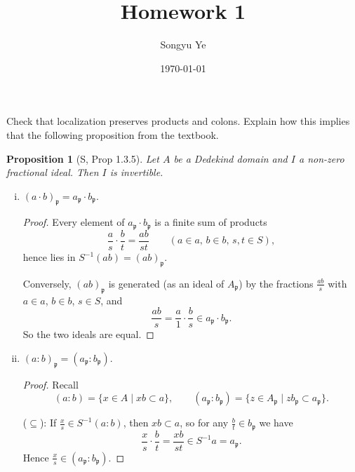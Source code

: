 \documentclass[12pt]{article}  %
\title{Homework 1}
\author{Songyu Ye}
\date{\today}
\newtheorem{proposition}{Proposition}[section]
\begin{document}
\psettitle

\begin{problem}{1}
Check that localization preserves products and colons. Explain how this implies that the following proposition from the textbook. 
\begin{proposition}[S, Prop 1.3.5]
    Let $A$ be a Dedekind domain and $I$ a non-zero fractional ideal. Then $I$ is invertible.       
\end{proposition}
\end{problem}

\begin{solution}

\begin{enumerate}[(i)]
  \item $(a \cdot b)_{\mathfrak{p}} = a_{\mathfrak{p}} \cdot b_{\mathfrak{p}}$.

  \begin{proof}
  Every element of $a_{\mathfrak{p}} \cdot b_{\mathfrak{p}}$ is a finite sum of products
  \[
    \frac{a}{s} \cdot \frac{b}{t} = \frac{ab}{st} \qquad (a \in a,\, b \in b,\, s,t \in S),
  \]
  hence lies in $S^{-1}(ab) = (ab)_{\mathfrak{p}}$.

  Conversely, $(ab)_{\mathfrak{p}}$ is generated (as an ideal of $A_{\mathfrak{p}}$) 
  by the fractions $\tfrac{ab}{s}$ with $a \in a$, $b \in b$, $s \in S$, and
  \[
    \frac{ab}{s} = \frac{a}{1} \cdot \frac{b}{s} \in a_{\mathfrak{p}} \cdot b_{\mathfrak{p}}.
  \]
  So the two ideals are equal.
  \end{proof}

  \item $(a : b)_{\mathfrak{p}} = (a_{\mathfrak{p}} : b_{\mathfrak{p}})$.

  \begin{proof}
  Recall
  \[
    (a : b) = \{x \in A \mid x b \subset a \}, 
    \qquad
    (a_{\mathfrak{p}} : b_{\mathfrak{p}}) = \{ z \in A_{\mathfrak{p}} \mid z b_{\mathfrak{p}} \subset a_{\mathfrak{p}} \}.
  \]

  ($\subseteq$): If $\tfrac{x}{s} \in S^{-1}(a : b)$, then $x b \subset a$, so for any $\tfrac{b}{t} \in b_{\mathfrak{p}}$ we have
  \[
    \frac{x}{s} \cdot \frac{b}{t} = \frac{xb}{st} \in S^{-1} a = a_{\mathfrak{p}}.
  \]
  Hence $\tfrac{x}{s} \in (a_{\mathfrak{p}} : b_{\mathfrak{p}})$.


\end{proof}
\end{enumerate}
\end{solution}
\end{document}
